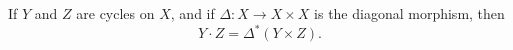 If $Y$ and $Z$ are cycles on $X$, and if $\Delta: X \to X \times X$ is the diagonal morphism, then
$$Y \cdot Z = \Delta^*(Y \times Z).$$
